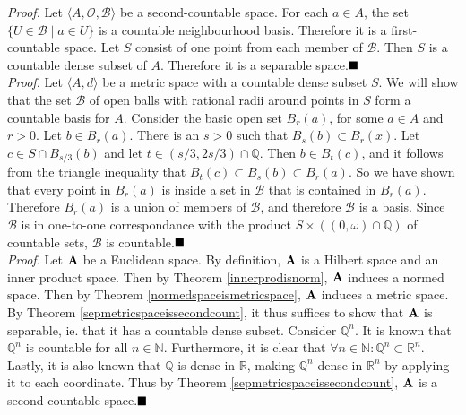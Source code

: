 \textit{Proof.}
Let $\langle A,\mathcal{O},\mathcal{B}\rangle$ be a second-countable space. For each $a\in A$, the set $\{U\in \mathcal{B}\mid a\in U\}$ is a countable neighbourhood basis. Therefore it is a first-countable space. Let $S$ consist of one point from each member of $\mathcal{B}$. Then $S$ is a countable dense subset of $A$. Therefore it is a separable space.$\qed$\\

\textit{Proof.}
Let $\langle A,d\rangle$ be a metric space with a countable dense subset $S$. We will show that the set $\mathcal{B}$ of open balls with rational radii around points in $S$ form a countable basis for $A$. Consider the basic open set $B_r(a)$, for some 
$a\in A$ and $r>0$. Let $b\in B_r(a)$. There is an $s>0$ such that $B_s(b)\subset B_r(x)$. Let $c\in S\cap B_{s/3}(b)$ and let $t\in (s/3,2s/3)\cap\mathbb{Q}$. Then $b\in B_t(c)$, and it follows from the triangle inequality that $B_t(c)\subset B_s(b)\subset B_r(a)$. So we have shown that every point in $B_r(a)$ is inside a set in $\mathcal{B}$ that is contained in $B_r(a)$. Therefore $B_r(a)$ is a union of members of $\mathcal{B}$, and therefore $\mathcal{B}$ is a basis. Since $\mathcal{B}$ is in one-to-one correspondance with the product $S\times((0,\omega)\cap\mathbb{Q})$ of countable sets, $\mathcal{B}$ is countable.$\qed$\\

\textit{Proof.}
Let ${\bf A}$ be a Euclidean space. By definition, ${\bf A}$ is a Hilbert space and an inner product space. Then by Theorem \ref{innerprodisnorm}, ${\bf A}$ induces a normed space. Then by Theorem \ref{normedspaceismetricspace}, ${\bf A}$ induces a metric space. By Theorem \ref{sepmetricspaceissecondcount}, it thus suffices to show that ${\bf A}$ is separable, ie. that it has a countable dense subset. Consider $\mathbb{Q}^n$. It is known that $\mathbb{Q}^n$ is countable for all $n\in\mathbb{N}$. Furthermore, it is clear that $\forall n\in\mathbb{N}: \mathbb{Q}^n\subset\mathbb{R}^n$. Lastly, it is also known that $\mathbb{Q}$ is dense in $\mathbb{R}$, making $\mathbb{Q}^n$ dense in $\mathbb{R}^n$ by applying it to each coordinate. Thus by Theorem \ref{sepmetricspaceissecondcount}, ${\bf A}$ is a second-countable space.$\qed$\\

